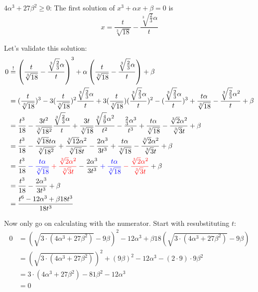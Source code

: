 $4 \alpha^3 + 27 \beta^2 \geq 0$:
The first solution of $x^3 + \alpha x + \beta = 0$ is
\[x = \frac{t}{\sqrt[3]{18}} - \frac{\sqrt[3]{\frac{2}{3}} \alpha }{t}\]

Let's validate this solution:
\allowdisplaybreaks
\begin{align}
    0 &\stackrel{!}{=} \left (\frac{t}{\sqrt[3]{18}} - \frac{\sqrt[3]{\frac{2}{3}} \alpha }{t} \right )^3 + \alpha \left (\frac{t}{\sqrt[3]{18}} - \frac{\sqrt[3]{\frac{2}{3}} \alpha }{t} \right ) + \beta\\
&= (\frac{t}{\sqrt[3]{18}})^3 
    - 3 (\frac{t}{\sqrt[3]{18}})^2 \frac{\sqrt[3]{\frac{2}{3}} \alpha }{t} 
    + 3 (\frac{t}{\sqrt[3]{18}})(\frac{\sqrt[3]{\frac{2}{3}} \alpha }{t})^2 
    - (\frac{\sqrt[3]{\frac{2}{3}} \alpha }{t})^3 
    + \frac{t \alpha}{\sqrt[3]{18}} - \frac{\sqrt[3]{\frac{2}{3}} \alpha^2 }{t} + \beta\\
&= \frac{t^3}{18}             
    - \frac{3t^2}{\sqrt[3]{18^2}} \frac{\sqrt[3]{\frac{2}{3}} \alpha }{t}
    + \frac{3t}{\sqrt[3]{18}} \frac{\sqrt[3]{\frac{4}{9}} \alpha^2 }{t^2} 
    - \frac{\frac{2}{3} \alpha^3 }{t^3} 
    + \frac{t \alpha }{\sqrt[3]{18}} - \frac{\sqrt[3]{2} \alpha^2 }{\sqrt[3]{3} t} + \beta\\
&= \frac{t^3}{18}
    - \frac{\sqrt[3]{18} t \alpha}{\sqrt[3]{18^2}}
    + \frac{\sqrt[3]{12} \alpha^2}{\sqrt[3]{18} t}  
    - \frac{2 \alpha^3 }{3t^3} 
    + \frac{t \alpha }{\sqrt[3]{18}} - \frac{\sqrt[3]{2} \alpha^2 }{\sqrt[3]{3} t} + \beta\\
&= \frac{t^3}{18} 
    \color{blue} - \frac{t \alpha}{\sqrt[3]{18}}
    \color{red}  + \frac{\sqrt[3]{2} \alpha^2}{\sqrt[3]{3} t}
    \color{black}- \frac{2 \alpha^3 }{3 t^3} 
    \color{blue} + \frac{t \alpha }{\sqrt[3]{18}} 
    \color{red}  - \frac{\sqrt[3]{2} \alpha^2 }{\sqrt[3]{3} t} 
    \color{black}+ \beta\\
&= \frac{t^3}{18} - \frac{2 \alpha^3 }{3 t^3} + \beta\\
&= \frac{t^6 - 12 \alpha^3 + \beta 18 t^3}{18t^3}
\end{align}

Now only go on calculating with the numerator. Start with resubstituting
$t$:
\begin{align}
0 &= (\sqrt{3 \cdot (4 \alpha^3 + 27 \beta^2)} -9\beta)^2 - 12 \alpha^3 + \beta 18 (\sqrt{3 \cdot (4 \alpha^3 + 27 \beta^2)} -9\beta)\\
&= (\sqrt{3 \cdot (4 \alpha^3 + 27 \beta^2)})^2 +(9\beta)^2 - 12 \alpha^3 -(2 \cdot 9)\cdot 9\beta^2\\
&= 3 \cdot (4 \alpha^3 + 27 \beta^2) -81 \beta^2 - 12 \alpha^3\\
&= 0
\end{align}
